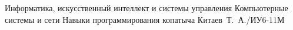 \makeresearchtitle
    {Информатика, искусственный интеллект и системы управления} %
    {Компьютерные системы и сети} %
    {Навыки программирования копатыча} %
    {Китаев~Т.~А./ИУ6-11М} %
    {} %
    {} %
    